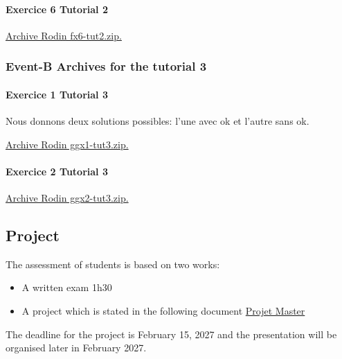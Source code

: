 \documentclass[ 12pt]{article}
\begin{document}
\paragraph{Exercice 6 Tutorial 2}
\href{http://mery54.github.io/teaching/mosos/models/fx6-tut2.zip}{Archive 
  Rodin   fx6-tut2.zip.}



 \subsubsection{Event-B Archives for   the tutorial 3}
\label{sec:event-b-archives}

\paragraph{Exercice 1 Tutorial 3}

Nous donnons deux solutions possibles: l'une avec ok et l'autre sans ok.

\href{http://mery54.github.io/teaching/mosos/models/qqx1-tut3.zip}{Archive 
  Rodin   ggx1-tut3.zip.}




\paragraph{Exercice 2 Tutorial 3}

\href{http://mery54.github.io/teaching/mosos/models/ggx2-tut3.zip}{Archive 
  Rodin   ggx2-tut3.zip.}






  \subsection{Project}
\label{sec:project}

The assessment  of students is based on two works:
\begin{itemize}
\item A written  exam   1h30
\item A project which is stated in the following document
  \href{http://mery54.github.io/teaching/mosos/lecturesnotes/master-projets2526.pdf}{Projet
    Master } 
\end{itemize}

The deadline for the project is  February 15, 2027 and the presentation
will be  organised later in February 2027. 
\end{document}
